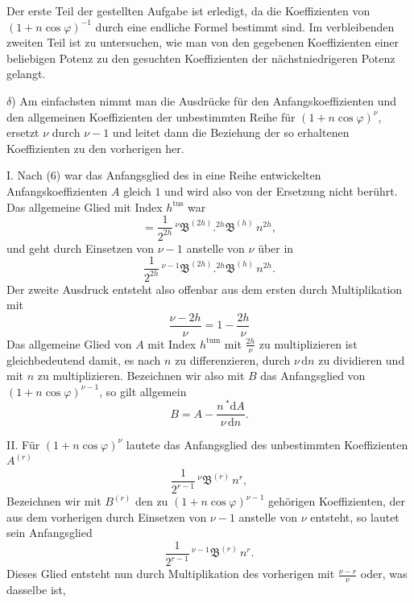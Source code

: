 Der erste Teil der gestellten Aufgabe ist erledigt, da die Koeffizienten von $(1+n\cos\varphi)^{-1}$ durch eine endliche Formel bestimmt sind. Im verbleibenden zweiten Teil ist zu untersuchen, wie man von den gegebenen Koeffizienten einer beliebigen Potenz zu den gesuchten Koeffizienten der nächstniedrigeren Potenz gelangt.

$\delta$) Am einfachsten nimmt man die Ausdrücke für den Anfangskoeffizienten und den allgemeinen Koeffizienten der unbestimmten Reihe für $(1+n\cos\varphi)^{\nu}$, ersetzt $\nu$ durch $\nu-1$ und leitet dann die Beziehung der so erhaltenen Koeffizienten zu den vorherigen her.

I. Nach (6) war das Anfangsglied des in eine Reihe entwickelten Anfangskoeffizienten $A$ gleich $1$ und wird also von der Ersetzung nicht berührt. Das allgemeine Glied mit Index $h^{\text{tus}}$ war
\[
= \frac{1}{2^{2h}}\,{}^{\nu}\mathfrak{B}^{(2h)} .  {}^{2h}\mathfrak{B}^{(h)}\,n^{2h},
\]
und geht durch Einsetzen von $\nu-1$ anstelle von $\nu$ über in
\[
\frac{1}{2^{2h}}\,{}^{\nu-1}\mathfrak{B}^{(2h)} .  {}^{2h}\mathfrak{B}^{(h)}\,n^{2h}.
\]
Der zweite Ausdruck entsteht also offenbar aus dem ersten durch Multiplikation mit
\[
\frac{\nu-2h}{\nu} = 1-\frac{2h}{\nu}
\]
Das allgemeine Glied von $A$ mit Index $h^{\text{tum}}$ mit $\frac{2h}{\nu}$ zu multiplizieren ist gleichbedeutend damit, es nach $n$ zu differenzieren, durch $\nu\,\mathrm{d}n$ zu dividieren und mit $n$ zu multiplizieren. Bezeichnen wir also mit $B$ das Anfangsglied von $(1+n\cos\varphi)^{\nu-1}$, so gilt allgemein
\[
B = A - \frac{n\,{}^{*}\!\mathrm{d}A}{\nu\,\mathrm{d}n}.
\]
\par\noindent\hspace*{\parindent}II. Für $(1+n\cos\varphi)^{\nu}$ lautete das Anfangsglied des unbestimmten Koeffizienten $A^{(r)}$
\[
\frac{1}{2^{r-1}}\,{}^{\nu}\mathfrak{B}^{(r)}\,n^{r},
\]
Bezeichnen wir mit $B^{(r)}$ den zu $(1+n\cos\varphi)^{\nu-1}$ gehörigen Koeffizienten, der aus dem vorherigen durch Einsetzen von $\nu-1$ anstelle von $\nu$ entsteht, so lautet sein Anfangsglied
\[
\frac{1}{2^{r-1}}\,{}^{\nu-1}\mathfrak{B}^{(r)}\,n^{r}.
\]
Dieses Glied entsteht nun durch Multiplikation des vorherigen mit $\frac{\nu-r}{\nu}$ oder, was dasselbe ist,
